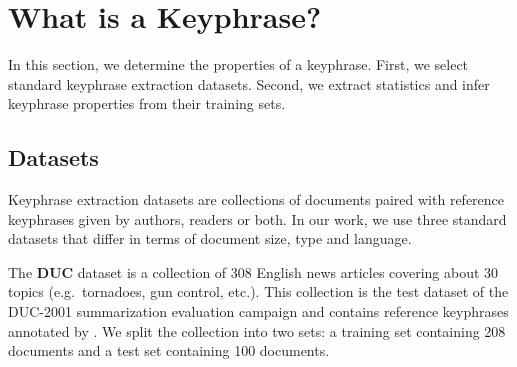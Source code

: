 
\section{What is a Keyphrase?}
\label{sec:definition_of_candidate_keyphrases}
  In this section, we determine the properties of a keyphrase. First, we select
  standard keyphrase extraction datasets. Second, we extract statistics and
  infer keyphrase properties from their training sets.

  \subsection{Datasets}
  \label{subsec:keyphrase_extraction_datasets}
    Keyphrase extraction datasets are collections of documents paired with
    reference keyphrases given by authors, readers or both. In our work, we use
    three standard datasets that differ in terms of document size,  type and
    language.

    The \textbf{DUC} dataset \cite{over2001duc} is a collection of 308 English
    news articles covering about 30 topics (e.g.~tornadoes, gun control, etc.).
    This collection is the test dataset of the DUC-2001 summarization evaluation
    campaign and contains reference keyphrases annotated by
    . We split the collection into two sets: a
    training set containing 208 documents and a test set containing 100
    documents.

